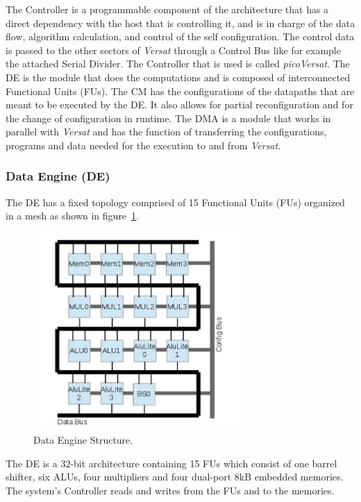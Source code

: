 The Controller is a programmable component of the architecture that has a direct
dependency with the host that is controlling it, and is in charge of the data
flow, algorithm calculation, and control of the self configuration. The control
data is passed to the other sectors of {\it Versat} through a Control Bus like
for example the attached Serial Divider. The Controller that is used is called
{\it picoVersat}.  The {\sc DE} is the module that does the computations and is
composed of interconnected Functional Units ({\sc FUs}).  The {\sc CM} has the
configurations of the datapaths that are meant to be executed by the {\sc
  DE}. It also allows for partial reconfiguration and for the change of
configuration in runtime.  The {\sc DMA} is a module that works in parallel with
{\it Versat} and has the function of transferring the configurations, programs
and data needed for the execution to and from {\it Versat}.

\subsubsection{Data Engine ({\sc DE})}

The {\sc DE} has a fixed topology comprised of 15 Functional Units ({\sc FUs})
organized in a mesh as shown in figure~\ref{fig:data_engine}.

\begin{figure}[!htbp]
    \centerline{\includegraphics[width=0.7\textwidth]{Figures/DataEngine.jpg}}
    \vspace{0cm}\caption{Data Engine Structure.}
    \label{fig:data_engine}
\end{figure}

The {\sc DE} is a 32-bit architecture containing 15 {\sc FUs} which consist of
one barrel shifter, six {\sc ALUs}, four multipliers and four dual-port 8kB
embedded memories.  The system's Controller reads and writes from the {\sc FUs}
and to the memories.

